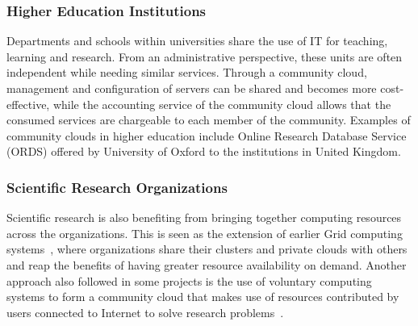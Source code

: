 \subsubsection{Higher Education Institutions}
Departments and schools within universities share the use of IT for teaching, learning and research. 
From an administrative perspective, these units are often independent while needing similar services. 
Through a community cloud, management and configuration of servers can be shared and becomes more cost-effective, while the accounting service of the community cloud allows that the consumed services are chargeable to each member of the community. 
Examples of community clouds in higher education include Online Research Database Service (ORDS) offered by University of Oxford to the institutions in United Kingdom.


\subsubsection{Scientific Research Organizations} 
Scientific research is also benefiting from bringing together computing resources across the organizations.
This is seen as the extension of earlier Grid computing systems~\cite{Foster2003}, where organizations share their clusters and private clouds with others and reap the benefits of having greater resource availability on demand. 
Another approach also followed in some projects is the use of voluntary computing systems to form a community cloud that makes use of resources contributed by users connected to Internet to solve research problems~\cite{Cappos2009}.



